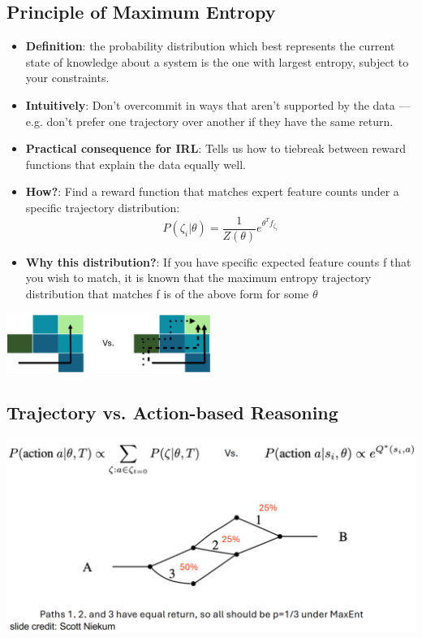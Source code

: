 \documentclass[10pt]{article}
\begin{document}
\subsection*{Principle of Maximum Entropy}
\begin{itemize}
	\item \textbf{Definition}: the probability distribution which best represents the current state of knowledge about a system is the one with largest entropy, subject to your constraints.
    \item \textbf{Intuitively}: Don't overcommit in ways that aren't supported by the data — e.g. don't prefer one trajectory over another if they have the same return.
    \item \textbf{Practical consequence for IRL}: Tells us how to tiebreak between reward functions that explain the data equally well.
    \item \textbf{How?}: Find a reward function that matches expert feature counts under a specific trajectory distribution:
    \[P(\zeta_i | \theta) = \frac{1}{Z(\theta)} e^{\theta^T f_{\zeta_i}}\]
    \item \textbf{Why this distribution?}: If you have specific expected feature counts f that you wish to match, it is known that the maximum entropy trajectory distribution that matches f is of the above form for some $\theta$
\end{itemize}

\begin{center}
    \includegraphics*[width=0.5\textwidth]{L2_25.png}
\end{center}

\subsection*{Trajectory vs. Action-based Reasoning}
\begin{center}
    \includegraphics*[width=\textwidth]{L2_26.png}
\end{center}
\end{document}
